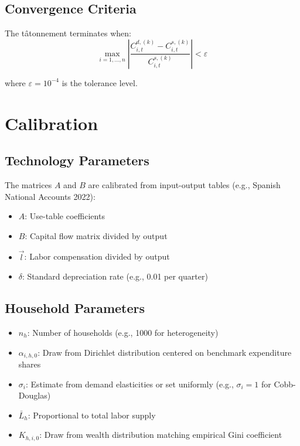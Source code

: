 \documentclass[12pt,a4paper]{article}
\theoremstyle{definition}
\theoremstyle{remark}
\begin{document}
\subsection{Convergence Criteria}

The tâtonnement terminates when:
\begin{equation}
    \max_{i=1,\ldots,n} \left|\frac{C_{i,t}^{d,(k)} - C_{i,t}^{s,(k)}}{C_{i,t}^{s,(k)}}\right| < \varepsilon
\end{equation}

where $\varepsilon = 10^{-4}$ is the tolerance level.

\section{Calibration}

\subsection{Technology Parameters}

The matrices $A$ and $B$ are calibrated from input-output tables (e.g., Spanish National Accounts 2022):
\begin{itemize}
    \item $A$: Use-table coefficients
    \item $B$: Capital flow matrix divided by output
    \item $\vec{l}$: Labor compensation divided by output
    \item $\delta$: Standard depreciation rate (e.g., 0.01 per quarter)
\end{itemize}

\subsection{Household Parameters}

\begin{itemize}
    \item $n_h$: Number of households (e.g., 1000 for heterogeneity)
    \item $\alpha_{i,h,0}$: Draw from Dirichlet distribution centered on benchmark expenditure shares
    \item $\sigma_i$: Estimate from demand elasticities or set uniformly (e.g., $\sigma_i = 1$ for Cobb-Douglas)
    \item $\bar{L}_h$: Proportional to total labor supply
    \item $K_{h,i,0}$: Draw from wealth distribution matching empirical Gini coefficient
\end{itemize}
\end{document}
